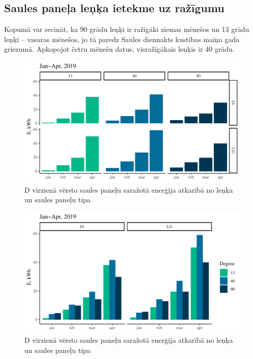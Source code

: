 \subsection{Saules paneļa leņķa ietekme uz ražīgumu}
Kopumā var secināt, ka 90 grādu leņķi ir ražīgāki ziemas mēnešos un 13 grādu leņķi -- vasaras mēnešos, jo tā paredz Saules diennakts kustības maiņa gada griezumā. Apkopojot četru mēnešu datus, visražīgākais leņķis ir 40 grādu.
\begin{figure}[h]
    \centering
    \includegraphics[width=\linewidth]{figures/results/jan_all_deg.pdf}
    \caption{D virzienā vērsto saules paneļu saražotā enerģija atkarībā no leņķa un saules paneļu tipa}
    \label{fig:ja_deg}
\end{figure}
\begin{figure}[h]
    \centering
    \includegraphics[width=\linewidth]{figures/results/degType.pdf}
    \caption{D virzienā vērsto saules paneļu saražotā enerģija atkarībā no leņķa un saules paneļu tipa}
    \label{fig:lg_ja_deg}
\end{figure}

